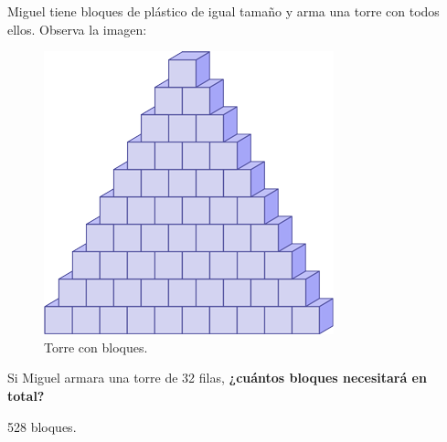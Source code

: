 \question[10] Miguel tiene bloques de plástico de igual tamaño y arma una torre con todos ellos. Observa la imagen:

\begin{minipage}{0.4\linewidth}
    \begin{figure}[H]
        \centering
        \includegraphics[width=0.7\linewidth]{../images/22bc4d835622314209af99a305ea2515952e3902}
        \caption{Torre con bloques.}
        \label{fig:22bc4d835622314209af99a305ea2515952e3902}
    \end{figure}
\end{minipage}\hfill
\begin{minipage}{0.6\linewidth}
    Si Miguel armara una torre de 32 filas,
    \textbf{¿cuántos bloques necesitará en total?}
    \begin{solutionbox}{1.2cm}
        528 bloques.
    \end{solutionbox}
\end{minipage}
